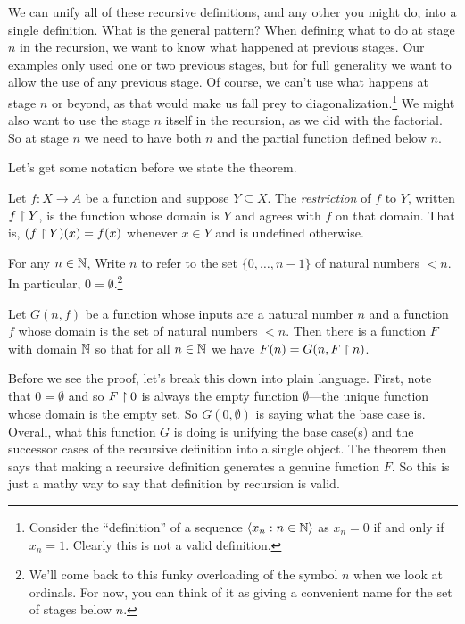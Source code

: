 \documentclass[10pt]{amsart}
\begin{document}
We can unify all of these recursive definitions, and any other you might do, into a single definition. What is the general pattern? When defining what to do at stage $n$ in the recursion, we want to know what happened at previous stages. Our examples only used one or two previous stages, but for full generality we want to allow the use of any previous stage. Of course, we can't use what happens at stage $n$ or beyond, as that would make us fall prey to diagonalization.\footnote{Consider the ``definition'' of a sequence ${\left\langle x_n : n \in \mathbb{N} \right\rangle}$ as $x_n = 0$ if and only if $x_n = 1$. Clearly this is not a valid definition.}
We might also want to use the stage $n$ itself in the recursion, as we did with the factorial. So at stage $n$ we need to have both $n$ and the partial function defined below $n$. 

Let's get some notation before we state the theorem.

\begin{definition}
Let $f : X \to A$ be a function and suppose $Y \subseteq X$. The \emph{restriction} of $f$ to $Y$, written $f \upharpoonright Y$, is the function whose domain is $Y$ and agrees with $f$ on that domain. That is, $(f \upharpoonright Y)(x) = f(x)$ whenever $x \in Y$ and is undefined otherwise. 
\end{definition}

\begin{definition}
For any $n \in \mathbb{N}$, Write $n$ to refer to the set $\{0, \ldots, n-1\}$ of natural numbers $< n$. In particular, $0 = \emptyset$.\footnote{We'll come back to this funky overloading of the symbol $n$ when we look at ordinals. For now, you can think of it as giving a convenient name for the set of stages below $n$.}
\end{definition}

\begin{theorem}
Let $G(n,f)$ be a function whose inputs are a natural number $n$ and a function $f$ whose domain is the set of natural numbers $< n$. Then there is a function $F$ with domain $\mathbb{N}$ so that for all $n \in \mathbb{N}$ we have $F(n) = G(n,F \upharpoonright n)$. 
\end{theorem}

Before we see the proof, let's break this down into plain language. First, note that $0 = \emptyset$ and so $F \upharpoonright 0$ is always the empty function $\emptyset$---the unique function whose domain is the empty set. So $G(0,\emptyset)$ is saying what the base case is. Overall, what this function $G$ is doing is unifying the base case(s) and the successor cases of the recursive definition into a single object. The theorem then says that making a recursive definition generates a genuine function $F$. So this is just a mathy way to say that definition by recursion is valid.
\end{document}
